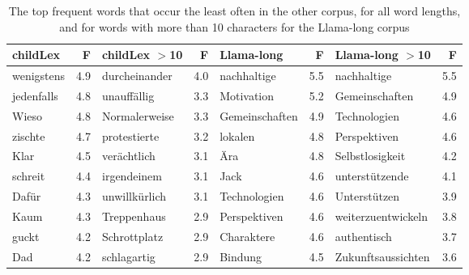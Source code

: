 \documentclass[doc, a4paper, anonymous]{apa7}
\begin{document}
\begin{table}[!htbp]
\caption{The top frequent words that occur the least often in the other corpus, for all word lengths, and for words with more than 10 characters for the Llama-long corpus}
\centering
\begin{tabular}{lrlrlrlr}
  \hline
childLex & F & childLex $>$10 & F & Llama-long & F & Llama-long $>$10 & F \\ 
  \hline
wenigstens & 4.9 & durcheinander & 4.0 & nachhaltige & 5.5 & nachhaltige & 5.5 \\ 
  jedenfalls & 4.8 & unauffällig & 3.3 & Motivation & 5.2 & Gemeinschaften & 4.9 \\ 
  Wieso & 4.8 & Normalerweise & 3.3 & Gemeinschaften & 4.9 & Technologien & 4.6 \\ 
  zischte & 4.7 & protestierte & 3.2 & lokalen & 4.8 & Perspektiven & 4.6 \\ 
  Klar & 4.5 & verächtlich & 3.1 & Ära & 4.8 & Selbstlosigkeit & 4.2 \\ 
  schreit & 4.4 & irgendeinem & 3.1 & Jack & 4.6 & unterstützende & 4.1 \\ 
  Dafür & 4.3 & unwillkürlich & 3.1 & Technologien & 4.6 & Unterstützen & 3.9 \\ 
  Kaum & 4.3 & Treppenhaus & 2.9 & Perspektiven & 4.6 & weiterzuentwickeln & 3.8 \\ 
  guckt & 4.2 & Schrottplatz & 2.9 & Charaktere & 4.6 & authentisch & 3.7 \\ 
  Dad & 4.2 & schlagartig & 2.9 & Bindung & 4.5 & Zukunftsaussichten & 3.6 \\ 
   \hline
\end{tabular}
\label{words-lllo-low}
\end{table}

\clearpage
\end{document}
